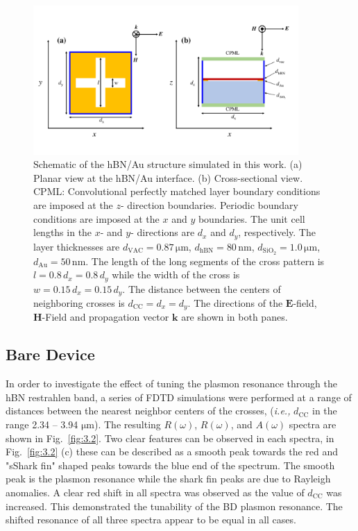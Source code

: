 \documentclass[preprint,
amsmath,amssymb,
aip,
jap,
floatfix,]{revtex4-2}
\begin{document}
		\begin{figure}[!htb]
		  \includegraphics[width=0.9\textwidth]{Figures/Fig1.pdf}
		  \caption{Schematic of the hBN/Au structure simulated in this work. (a) Planar view at the hBN/Au interface. (b) Cross-sectional view. CPML: Convolutional perfectly matched layer boundary conditions are imposed at the $z$- direction boundaries. Periodic boundary conditions are imposed at the $x$ and $y$ boundaries. The unit cell lengths in the $x$- and $y$- directions are $d_{x} $ and $d_{y}$, respectively. The layer thicknesses are $d_\mathrm{VAC} = 0.87\, \si{\um}$, $d_\mathrm{hBN} = 80\, \si{\nm}$, $d_\mathrm{SiO_{2}} = 1.0\, \si{\um}$, $d_\mathrm{Au} = 50\, \si{\nm}$. The length of the long segments of the cross pattern is $l = 0.8 \, d_{x} = 0.8 \, d_{y}$ while the width of the cross is  $w = 0.15 \, d_{x} = 0.15 \, d_{y}$. The distance between the centers of neighboring crosses is $d_\mathrm{CC} = d_{x} = d_{y}$. The directions of the $\bm{E}$-field, $\bm{H}$-Field and propagation vector $\bm{k}$ are shown in both panes.}
		  \label{fig:3.1}
		\end{figure}
 

		\subsection{Bare Device}
		\label{sec:BD}

		In order to investigate the effect of tuning the plasmon resonance through the hBN restrahlen band, a series of FDTD simulations were performed at a range of distances between the nearest neighbor centers of the crosses, (\textit{i.e.,} $d_\mathrm{CC}$ in the range 2.34 -- 3.94 $\si{\um}$). The resulting $R(\omega)$, $R(\omega)$, and $A(\omega)$ spectra are shown in Fig.~\ref{fig:3.2}. Two clear features can be observed in each spectra, in Fig.~\ref{fig:3.2} (c) these can be described as a smooth peak towards the red and "sShark fin" shaped peaks towards the blue end of the spectrum. The smooth peak is the plasmon resonance while the shark fin peaks are due to Rayleigh anomalies.  A clear red shift in all spectra was observed as the value of $d_\mathrm{CC}$ was increased. This demonstrated the tunability of the BD plasmon resonance. The shifted resonance of all three spectra appear to be equal in all cases. 
\end{document}
